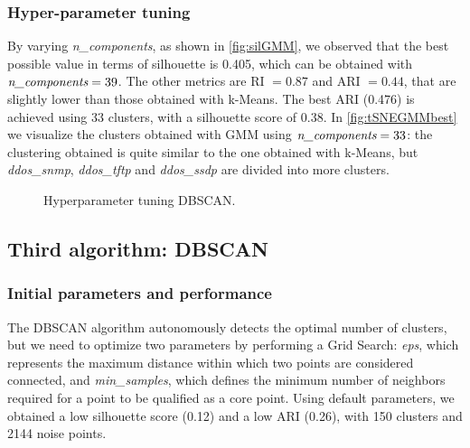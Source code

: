 \documentclass[acmlarge,nonacm]{acmart}
\begin{document}
\subsubsection{Hyper-parameter tuning}
By varying \emph{n\_components}, as shown in \cref{fig:silGMM}, we observed that the best possible value in terms of silhouette is 0.405, which can be obtained with $\emph{n\_components}=39$. The other metrics are RI $=0.87$ and ARI $=0.44$, that are slightly lower than those obtained with k-Means. The best ARI (0.476) is achieved using 33 clusters, with a silhouette score of 0.38. 
In \cref{fig:tSNEGMMbest} we visualize the clusters obtained with GMM using $\emph{n\_components}=33$: the clustering obtained is quite similar to the one obtained with k-Means, but \emph{ddos\_snmp}, \emph{ddos\_tftp} and \emph{ddos\_ssdp} are divided into more clusters.

\begin{figure}
	\centering
     \quad
     \quad   
  	\caption{Hyperparameter tuning DBSCAN.} 
    \label{fig:DBSCAN_scatPlot}
\end{figure}

\subsection{Third algorithm: DBSCAN}
\subsubsection{Initial parameters and performance}
The DBSCAN algorithm autonomously detects the optimal number of clusters, but we need to optimize two parameters by performing a Grid Search: \emph{eps}, which represents the maximum distance within which two points are considered connected, and \emph{min\_samples}, which defines the minimum number of neighbors required for a point to be qualified as a core point. Using default parameters, we obtained a low silhouette score (0.12) and a low ARI (0.26), with 150 clusters and 2144 noise points.
\end{document}
